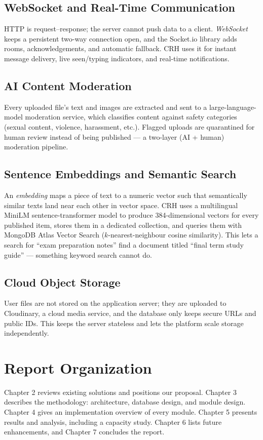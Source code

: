 \documentclass[12pt,a4paper]{report}
\begin{document}
\subsection{WebSocket and Real-Time Communication}
HTTP is request--response; the server cannot push data to a client.
\textit{WebSocket} keeps a persistent two-way connection open, and
the Socket.io library adds rooms, acknowledgements, and automatic
fallback. CRH uses it for instant message delivery, live seen/typing
indicators, and real-time notifications.

\subsection{AI Content Moderation}
Every uploaded file's text and images are extracted and sent to a
large-language-model moderation service, which classifies content
against safety categories (sexual content, violence, harassment,
etc.). Flagged uploads are quarantined for human review instead of
being published --- a two-layer (AI + human) moderation pipeline.

\subsection{Sentence Embeddings and Semantic Search}
An \textit{embedding} maps a piece of text to a numeric vector such
that semantically similar texts land near each other in vector
space. CRH uses a multilingual MiniLM sentence-transformer model to
produce 384-dimensional vectors for every published item, stores
them in a dedicated collection, and queries them with MongoDB Atlas
Vector Search ($k$-nearest-neighbour cosine similarity). This lets a
search for ``exam preparation notes'' find a document titled
``final term study guide'' --- something keyword search cannot do.

\subsection{Cloud Object Storage}
User files are not stored on the application server; they are
uploaded to Cloudinary, a cloud media service, and the database only
keeps secure URLs and public IDs. This keeps the server stateless
and lets the platform scale storage independently.

\section{Report Organization}
Chapter 2 reviews existing solutions and positions our proposal.
Chapter 3 describes the methodology: architecture, database design,
and module design. Chapter 4 gives an implementation overview of
every module. Chapter 5 presents results and analysis, including a
capacity study. Chapter 6 lists future enhancements, and Chapter 7
concludes the report.
\end{document}
